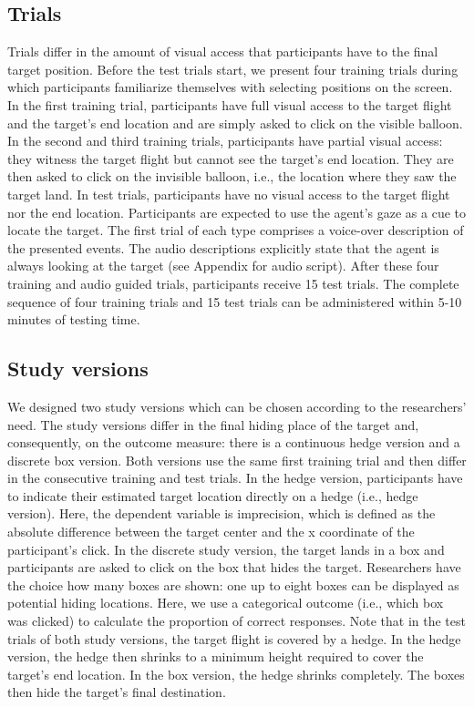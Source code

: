 \documentclass[
  man,floatsintext]{apa6}
\begin{document}
\hypertarget{trials}{%
\subsection{Trials}\label{trials}}

Trials differ in the amount of visual access that participants have to the final target position. Before the test trials start, we present four training trials during which participants familiarize themselves with selecting positions on the screen. In the first training trial, participants have full visual access to the target flight and the target's end location and are simply asked to click on the visible balloon. In the second and third training trials, participants have partial visual access: they witness the target flight but cannot see the target's end location. They are then asked to click on the invisible balloon, i.e., the location where they saw the target land. In test trials, participants have no visual access to the target flight nor the end location. Participants are expected to use the agent's gaze as a cue to locate the target. The first trial of each type comprises a voice-over description of the presented events. The audio descriptions explicitly state that the agent is always looking at the target (see Appendix for audio script). After these four training and audio guided trials, participants receive 15 test trials. The complete sequence of four training trials and 15 test trials can be administered within 5-10 minutes of testing time.

\hypertarget{study-versions}{%
\subsection{Study versions}\label{study-versions}}

We designed two study versions which can be chosen according to the researchers' need. The study versions differ in the final hiding place of the target and, consequently, on the outcome measure: there is a continuous hedge version and a discrete box version. Both versions use the same first training trial and then differ in the consecutive training and test trials.
In the hedge version, participants have to indicate their estimated target location directly on a hedge (i.e., hedge version).
Here, the dependent variable is imprecision, which is defined as the absolute difference between the target center and the x coordinate of the participant's click.
In the discrete study version, the target lands in a box and participants are asked to click on the box that hides the target. Researchers have the choice how many boxes are shown: one up to eight boxes can be displayed as potential hiding locations. Here, we use a categorical outcome (i.e., which box was clicked) to calculate the proportion of correct responses.
Note that in the test trials of both study versions, the target flight is covered by a hedge. In the hedge version, the hedge then shrinks to a minimum height required to cover the target's end location. In the box version, the hedge shrinks completely. The boxes then hide the target's final destination.
\end{document}
